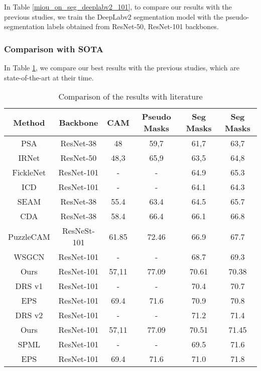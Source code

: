 \documentclass[sn-mathphys]{sn-jnl}
\theoremstyle{thmstyleone}
\theoremstyle{thmstyletwo}\newtheorem{example}{Example}\newtheorem{remark}{Remark}
\theoremstyle{thmstylethree}\newtheorem{definition}{Definition}
\begin{document}
In Table \ref{miou_on_seg_deeplabv2_101}, to compare our results with the previous studies, we train the DeepLabv2 segmentation model with the pseudo-segmentation labels obtained from ResNet-50, ResNet-101 backbones.


\subsubsection{Comparison with SOTA}\label{comparison_sota}

In Table \ref{sota}, we compare our best results with the previous studies, which are state-of-the-art at their time. 

\begin{table}[!ht]
\begin{center}
\begin{minipage}{\textwidth}
\caption{Comparison of the results with literature}\label{sota}\begin{tabular*}{\textwidth}{@{\extracolsep{\fill}}cccccc@{\extracolsep{\fill}}}
\toprule Method & Backbone  & CAM\footnotemark[1] & Pseudo Masks\footnotemark[1] & Seg Masks\footnotemark[2] & Seg Masks\footnotemark[3] \\
\midrule
PSA & ResNet-38  & 48 & 59,7 & 61,7 & 63,7 \\
IRNet & ResNet-50  & 48,3 & 65,9 & 63,5 & 64,8 \\
FickleNet & ResNet-101  & - & - & 64.9 & 65.3\\ 
ICD & ResNet-101  & - & - & 64.1 & 64.3\\
SEAM & ResNet-38  & 55.4 & 63.4 & 64.5 & 65.7\\
CDA & ResNet-38 & 58.4 & 66.4 & 66.1 & 66.8 \\
PuzzleCAM & ResNeSt-101 & 61.85 & 72.46 & 66.9 & 67.7 \\
WSGCN & ResNet-101 & - & - & 68.7 & 69.3 \\
Ours\footnotemark[4] & ResNet-101 & 57,11 & 77.09 & 70.61 & 70.38 \\
DRS v1\footnotemark[4] & ResNet-101 &  - & - & 70.4 & 70.7 \\
EPS\footnotemark[4] & ResNet-101 & 69.4 & 71.6 & 70.9  & 70.8 \\
DRS v2\footnotemark[4] & ResNet-101 & - & - & 71.2 & 71.4 \\
Ours\footnotemark[5] & ResNet-101 & 57,11 & 77.09 & 70.51 & 71.45 \\
SPML\footnotemark[4] & ResNet-101 & - & - & 69.5 & 71.6 \\
EPS\footnotemark[7] & ResNet-101 & 69.4 & 71.6 & 71.0  & 71.8 \\

\end{tabular*}
\end{minipage}
\end{center}
\end{table}
\end{document}
